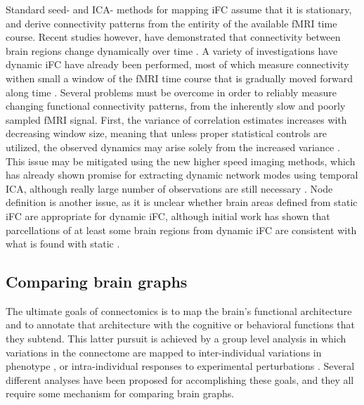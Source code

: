Standard seed- and ICA- methods for mapping iFC assume that it is stationary,
and derive connectivity patterns from the entirity of the available fMRI time
course. Recent studies however, have demonstrated that connectivity between
brain regions change dynamically over time \cite{Chang, Keilholz,
Hutchinson2013, Fu2013, Zhen}. A variety of investigations have dynamic iFC have
already been performed, most of which measure connectivity withen small a
window of the fMRI time course that is gradually moved forward along time
\cite{}. Several problems must be overcome in order to reliably measure
changing functional connectivity patterns, from the inherently slow and poorly
sampled fMRI signal. First, the variance of correlation estimates increases
with decreasing window size, meaning that unless proper statistical controls
are utilized, the observed dynamics may arise solely from the increased
variance \cite{}. This issue may be mitigated using the new higher speed
imaging methods, which has already shown promise for extracting dynamic network
modes using temporal ICA, although really large number of observations are
still necessary \cite{Smith2012}. Node definition is another
issue, as it is unclear whether brain areas defined from static iFC are
appropriate for dynamic iFC, although initial work has shown that parcellations
of at least some brain regions from dynamic iFC are consistent with what is
found with static \cite{Yang2013}.

\subsection{Comparing brain graphs} 

The ultimate goals of connectomics is to map the brain's functional
architecture and to annotate that architecture with the cognitive or behavioral
functions that they subtend. This latter pursuit is achieved by a group level
analysis in which variations in the connectome are mapped to inter-individual
variations in phenotype \cite{Kelly2011}, or intra-individual responses to
experimental perturbations \cite{Shirer}. Several different analyses have been
proposed for accomplishing these goals, and they all require some mechanism for
comparing brain graphs. 
 
